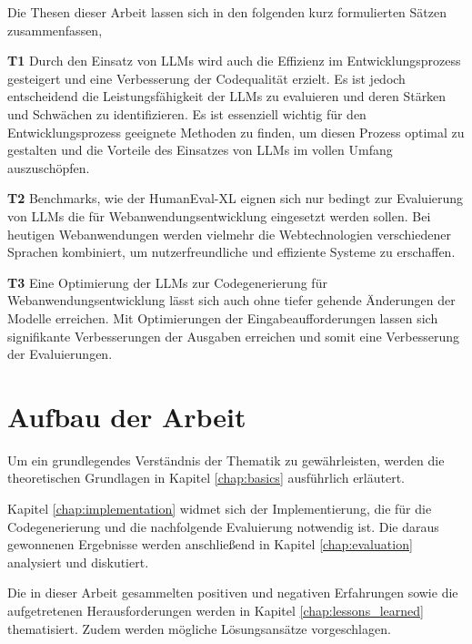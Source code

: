 Die Thesen dieser Arbeit lassen sich in den folgenden kurz formulierten Sätzen zusammenfassen,

\begin{myitemize}
	\item[\textbf{T1}] Durch den Einsatz von LLMs wird auch die Effizienz im Entwicklungsprozess gesteigert und eine Verbesserung der Codequalität erzielt. Es ist jedoch entscheidend die Leistungsfähigkeit der LLMs zu evaluieren und deren Stärken und Schwächen zu identifizieren. Es ist essenziell wichtig für den Entwicklungsprozess geeignete Methoden zu finden, um diesen Prozess optimal zu gestalten und die Vorteile des Einsatzes von LLMs im vollen Umfang auszuschöpfen.
	\item[\textbf{T2}] Benchmarks, wie der HumanEval-XL eignen sich nur bedingt zur Evaluierung von LLMs die für Webanwendungsentwicklung eingesetzt werden sollen. Bei heutigen Webanwendungen werden vielmehr die Webtechnologien verschiedener Sprachen kombiniert, um nutzerfreundliche und effiziente Systeme zu erschaffen.
	\item[\textbf{T3}] Eine Optimierung der LLMs zur Codegenerierung für Webanwendungsentwicklung lässt sich auch ohne tiefer gehende Änderungen der Modelle erreichen. Mit Optimierungen der Eingabeaufforderungen lassen sich signifikante Verbesserungen der Ausgaben erreichen und somit eine Verbesserung der Evaluierungen.
\end{myitemize}



\section{Aufbau der Arbeit}
Um ein grundlegendes Verständnis der Thematik zu gewährleisten, werden die theoretischen Grundlagen in Kapitel \ref{chap:basics} ausführlich erläutert.\vspace{0.2cm}

Kapitel \ref{chap:implementation} widmet sich der Implementierung, die für die Codegenerierung und die nachfolgende Evaluierung notwendig ist. Die daraus gewonnenen Ergebnisse werden anschließend in Kapitel \ref{chap:evaluation} analysiert und diskutiert.\vspace{0.2cm}

Die in dieser Arbeit gesammelten positiven und negativen Erfahrungen sowie die aufgetretenen Herausforderungen werden in Kapitel \ref{chap:lessons_learned} thematisiert. Zudem werden mögliche Lösungsansätze vorgeschlagen.\vspace{0.2cm}

